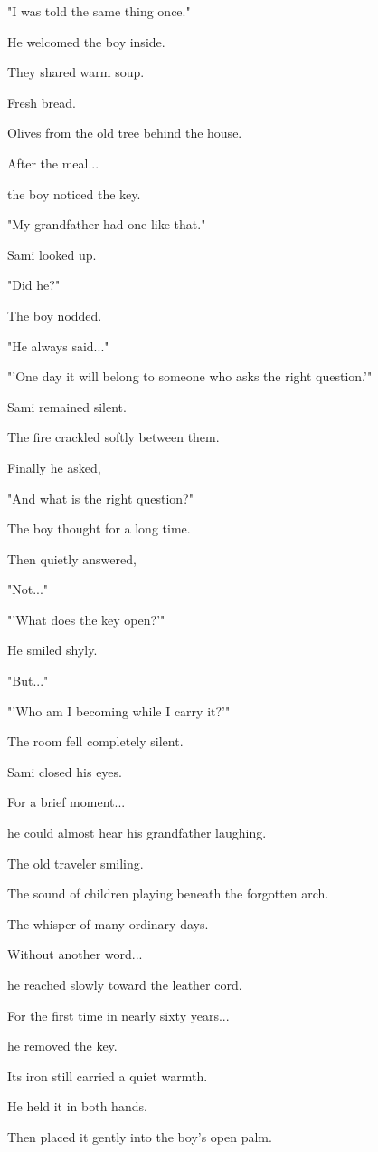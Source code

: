 \documentclass[12pt,openany]{book}
\begin{document}
"I was told the same thing once."

He welcomed the boy inside.

They shared warm soup.

Fresh bread.

Olives from the old tree behind the house.

After the meal...

the boy noticed the key.

"My grandfather had one like that."

Sami looked up.

"Did he?"

The boy nodded.

"He always said..."

"'One day it will belong to someone who asks the right question.'"

Sami remained silent.

The fire crackled softly between them.

Finally he asked,

"And what is the right question?"

The boy thought for a long time.

Then quietly answered,

"Not..."

"'What does the key open?'"

He smiled shyly.

"But..."

"'Who am I becoming while I carry it?'"

The room fell completely silent.

Sami closed his eyes.

For a brief moment...

he could almost hear his grandfather laughing.

The old traveler smiling.

The sound of children playing beneath the forgotten arch.

The whisper of many ordinary days.

Without another word...

he reached slowly toward the leather cord.

For the first time in nearly sixty years...

he removed the key.

Its iron still carried a quiet warmth.

He held it in both hands.

Then placed it gently into the boy's open palm.
\end{document}
